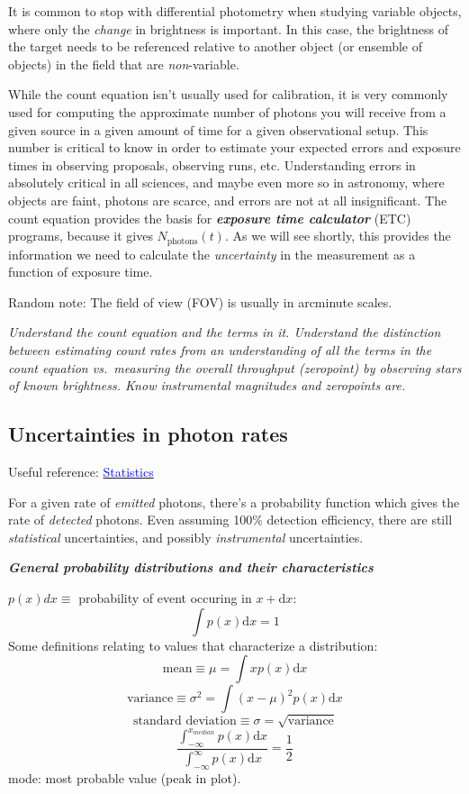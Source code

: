 \documentclass[12pt]{article}
\begin{document}
It is common to stop with differential photometry when studying
variable objects, where only the \emph{change} in brightness is
important. In this case, the brightness of the target needs to be
referenced relative to another object (or ensemble of objects)
in the field that are \emph{non}-variable.

While the count equation isn't usually used for calibration,
it is very commonly used for computing the approximate number of
photons you will receive from a given source in a given amount of time
for a given observational setup. This number is critical to know in
order to estimate your expected errors and exposure times in observing
proposals, observing runs, etc. Understanding errors in absolutely
critical in all sciences, and maybe even more so in astronomy, where
objects are faint, photons are scarce, and errors are not at all
insignificant. The count equation provides the basis for
\textbf\emph{exposure time calculator} (ETC) programs,
because it gives $N_{\textrm{photons}}(t)$.
As we will see shortly, this provides the information we need to
calculate the \emph{uncertainty} in the measurement
as a function of exposure time.

Random note: The field of view (FOV) is usually in arcminute scales.

\textcolor{om}{\emph{Understand the count equation and the terms in
it. Understand the distinction between estimating count rates from an
understanding of all the terms in the count equation vs.\ measuring the
overall throughput (zeropoint) by observing stars of known brightness.
Know instrumental magnitudes and zeropoints are.}}
\subsection{Uncertainties in photon rates}
Useful reference:
\href{http://users.wfu.edu/ecarlson/skeptic/statistics.pdf}
{\textcolor{blue}{Statistics}}

For a given rate of \emph{emitted} photons, there's a probability function
which gives the rate of \emph{detected} photons.
Even assuming 100\% detection efficiency, there are still
\emph{statistical} uncertainties, and possibly \emph{instrumental}
uncertainties.

\textbf{\emph{General probability distributions and their
characteristics}}

$p(x)dx \equiv$ probability of event occuring in $x + \textrm{d}x$:
        $$ \int p(x)\textrm{d}x = 1 $$
Some definitions relating to values that characterize a distribution:
$$    \textrm{mean} \equiv \mu = \int xp(x)\textrm{d}x $$
$$    \textrm{variance} \equiv \sigma^2 = \int (x-\mu)^2 p(x)\textrm{d}x $$
$$    \textrm{standard\ deviation} \equiv \sigma =
        \sqrt{\textrm{variance}} $$
$$    \frac{ \int_{-\infty}^{x_{median}} p(x)\textrm{d}x }
      { \int_{-\infty}^{\infty} p(x)\textrm{d}x }
      = \frac{1}{2} $$
mode: most probable value (peak in plot).
\end{document}
